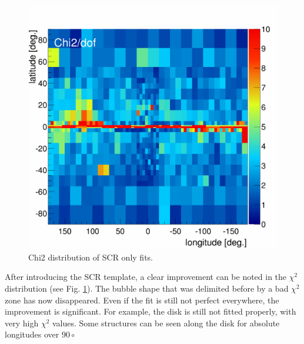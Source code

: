\begin{figure}[h]
  	\centering
	\includegraphics[width=.5\linewidth]{pic/results/SCRonly_Chi2Distribution.png}
  	\caption{Chi2 distribution of SCR only fits.}
  	\label{fig:SCRonly_fit}
\end{figure}

After introducing the SCR template, a clear improvement can be noted in the $\chi^2$ distribution (see Fig. \ref{fig:SCRonly_fit}). The bubble shape that was delimited before by a bad $\chi^2$ zone has now disappeared. Even if the fit is still not perfect everywhere, the improvement is significant. For example, the disk is still not fitted properly, with very high $\chi^2$ values. Some structures can be seen along the disk for absolute longitudes over $90\circ$

